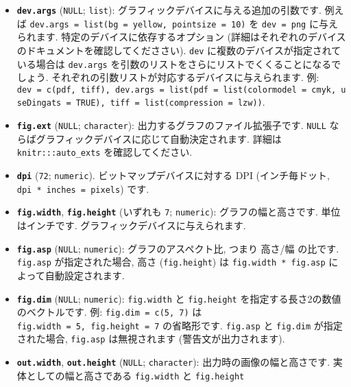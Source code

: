\documentclass[
  lualatex,ja=standard,jafont=noto-otf]{bxjsreport}
\providecommand{\tightlist}{%
  \setlength{\itemsep}{0pt}\setlength{\parskip}{0pt}}
\begin{document}
\begin{itemize}
\tightlist
\item
  \textbf{\texttt{dev.args}} (\texttt{NULL}; \texttt{list}):
  グラフィックデバイスに与える追加の引数です. 例えば
  \texttt{dev.args\ =\ list(bg\ =\ \textquotesingle{}yellow\textquotesingle{},\ pointsize\ =\ 10)}
  を \texttt{dev\ =\ \textquotesingle{}png\textquotesingle{}}
  に与えられます. 特定のデバイスに依存するオプション
  (詳細はそれぞれのデバイスのドキュメントを確認してくだささい).
  \texttt{dev} に複数のデバイスが指定されている場合は \texttt{dev.args}
  を引数のリストをさらにリストでくくることになるでしょう.
  それぞれの引数リストが対応するデバイスに与えられます. 例:
  \texttt{dev\ =\ c(\textquotesingle{}pdf\textquotesingle{},\ \textquotesingle{}tiff\textquotesingle{}),\ dev.args\ =\ list(pdf\ =\ list(colormodel\ =\ \textquotesingle{}cmyk\textquotesingle{},\ useDingats\ =\ TRUE),\ tiff\ =\ list(compression\ =\ \textquotesingle{}lzw\textquotesingle{}))}.
\item
  \textbf{\texttt{fig.ext}} (\texttt{NULL}; \texttt{character}):
  出力するグラフのファイル拡張子です. \texttt{NULL}
  ならばグラフィックデバイスに応じて自動決定されます. 詳細は
  \texttt{knitr:::auto\_exts} を確認してください.
\item
  \textbf{\texttt{dpi}} (\texttt{72}; \texttt{numeric}).
  ビットマップデバイスに対する DPI (インチ毎ドット,
  \texttt{dpi\ *\ inches\ =\ pixels}) です.
\item
  \textbf{\texttt{fig.width}}, \textbf{\texttt{fig.height}} (いずれも
  \texttt{7}; \texttt{numeric}): グラフの幅と高さです. 単位はインチです.
  グラフィックデバイスに与えられます.
\item
  \textbf{\texttt{fig.asp}} (\texttt{NULL}; \texttt{numeric}):
  グラフのアスペクト比, つまり 高さ/幅 の比です. \texttt{fig.asp}
  が指定された場合, 高さ (\texttt{fig.height}) は
  \texttt{fig.width\ *\ fig.asp} によって自動設定されます.
\item
  \textbf{\texttt{fig.dim}} (\texttt{NULL}; \texttt{numeric}):
  \texttt{fig.width} と \texttt{fig.height}
  を指定する長さ2の数値のベクトルです. 例: \texttt{fig.dim\ =\ c(5,\ 7)}
  は \texttt{fig.width\ =\ 5,\ fig.height\ =\ 7} の省略形です.
  \texttt{fig.asp} と \texttt{fig.dim} が指定された場合,
  \texttt{fig.asp} は無視されます (警告文が出力されます).
\item
  \textbf{\texttt{out.width}}, \textbf{\texttt{out.height}}
  (\texttt{NULL}; \texttt{character}): 出力時の画像の幅と高さです.
  実体としての幅と高さである \texttt{fig.width} と \texttt{fig.height}

\end{itemize}
\end{document}
